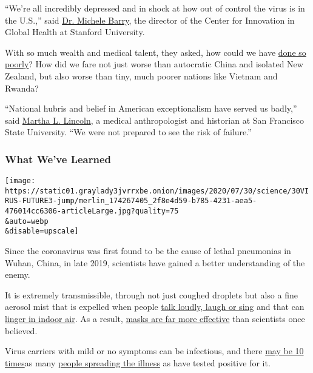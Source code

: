 ``We're all incredibly depressed and in shock at how out of control the
virus is in the U.S.,'' said
\href{https://profiles.stanford.edu/michele-barry}{Dr. Michele Barry},
the director of the Center for Innovation in Global Health at Stanford
University.

With so much wealth and medical talent, they asked, how could we have
\href{https://www.nytimes3xbfgragh.onion/2020/07/10/us/daily-virus-death-toll-rises-in-some-states.html}{done
so poorly}? How did we fare not just worse than autocratic China and
isolated New Zealand, but also worse than tiny, much poorer nations like
Vietnam and Rwanda?

``National hubris and belief in American exceptionalism have served us
badly,'' said
\href{https://anthropology.sfsu.edu/people/faculty/martha-lincoln}{Martha
L. Lincoln}, a medical anthropologist and historian at San Francisco
State University. ``We were not prepared to see the risk of failure.''

\hypertarget{what-weve-learned}{%
\subsubsection{What We've Learned}\label{what-weve-learned}}

\texttt{[image: https://static01.graylady3jvrrxbe.onion/images/2020/07/30/science/30VIRUS-FUTURE3-jump/merlin\_174267405\_2f8e4d59-b785-4231-aea5-476014cc6306-articleLarge.jpg?quality=75\\\&auto=webp\\\&disable=upscale]}

Since the coronavirus was first found to be the cause of lethal
pneumonias in Wuhan, China, in late 2019, scientists have gained a
better understanding of the enemy.

It is extremely transmissible, through not just coughed droplets but
also a fine aerosol mist that is expelled when people
\href{https://www.nytimes3xbfgragh.onion/2020/05/14/health/coronavirus-infections.html}{talk
loudly, laugh or sing} and that can
\href{https://www.nytimes3xbfgragh.onion/2020/07/04/health/239-experts-with-one-big-claim-the-coronavirus-is-airborne.html}{linger
in indoor air}. As a result,
\href{https://www.nytimes3xbfgragh.onion/2020/07/27/health/coronavirus-mask-protection.html}{masks
are far more effective} than scientists once believed.

Virus carriers with mild or no symptoms can be infectious, and there
\href{https://khn.org/morning-breakout/number-of-americans-infected-with-virus-could-be-10-times-higher-than-official-count-cdc-chief-warns/}{may
be 10 times}as many
\href{https://www.nytimes3xbfgragh.onion/2020/07/21/health/coronavirus-infections-us.html}{people
spreading the illness} as have tested positive for it.

